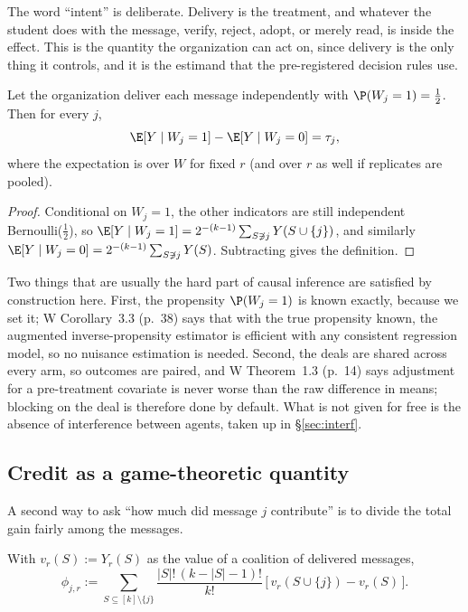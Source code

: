 \documentclass[11pt]{article}
\numberwithin{theorem}{section}
\theoremstyle{definition}
\theoremstyle{problemstyle}
\begin{document}
The word ``intent'' is deliberate. Delivery is the treatment, and whatever the student does with the message, verify,
reject, adopt, or merely read, is inside the effect. This is the quantity the organization can act on, since delivery
is the only thing it controls, and it is the estimand that the pre-registered decision rules use.

\begin{prop}\label{prop:ident}
Let the organization deliver each message independently with $\P(W_j=1)=\tfrac12$. Then for every $j$,
\[
\E[Y\mid W_j=1] - \E[Y\mid W_j=0] = \tau_j ,
\]
where the expectation is over $W$ for fixed $r$ (and over $r$ as well if replicates are pooled).
\end{prop}
\begin{proof}
Conditional on $W_j=1$, the other indicators are still independent Bernoulli($\tfrac12$), so $\E[Y\mid W_j=1] =
2^{-(k-1)}\sum_{S\not\ni j}Y(S\cup\{j\})$, and similarly $\E[Y\mid W_j=0] = 2^{-(k-1)}\sum_{S\not\ni j}Y(S)$.
Subtracting gives the definition.
\end{proof}

\begin{remark}
Two things that are usually the hard part of causal inference are satisfied by construction here. First, the
propensity $\P(W_j=1)$ is known exactly, because we set it; W Corollary~3.3 (p.~38) says that with the true propensity
known, the augmented inverse-propensity estimator is efficient with any consistent regression model, so no nuisance
estimation is needed. Second, the deals are shared across every arm, so outcomes are paired, and W Theorem~1.3
(p.~14) says adjustment for a pre-treatment covariate is never worse than the raw difference in means; blocking on the
deal is therefore done by default. What is not given for free is the absence of interference between agents, taken up
in \S\ref{sec:interf}.
\end{remark}

\subsection{Credit as a game-theoretic quantity}

A second way to ask ``how much did message $j$ contribute'' is to divide the total gain fairly among the messages.

\begin{definition}\label{def:shapley}
With $v_r(S):=Y_r(S)$ as the value of a coalition of delivered messages,
\[
\phi_{j,r} := \sum_{S\subseteq[k]\setminus\{j\}} \frac{|S|!\,(k-|S|-1)!}{k!}\,\big[\,v_r(S\cup\{j\}) - v_r(S)\,\big].
\]
\end{definition}
\end{document}

